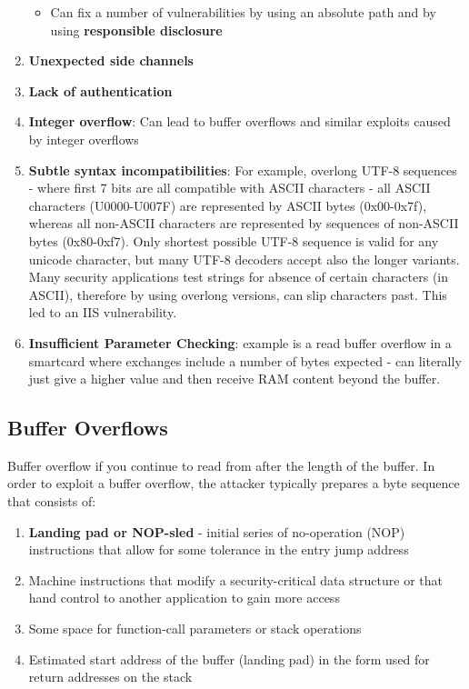 \documentclass{article}
\begin{document}
\begin{enumerate}
\begin{itemize}
		\item Can fix a number of vulnerabilities by using an absolute path and by using \textbf{responsible disclosure}
	\end{itemize}
	\item \textbf{ Unexpected side channels}
	\item \textbf{Lack of authentication}
	\item \textbf{Integer overflow}: Can lead to buffer overflows and similar exploits caused by integer overflows
	\item \textbf{Subtle syntax incompatibilities}: For example, overlong UTF-8 sequences - where first 7 bits are all compatible with ASCII characters - all ASCII characters (U0000-U007F) are represented by ASCII bytes (0x00-0x7f), whereas all non-ASCII characters are represented by sequences of non-ASCII bytes (0x80-0xf7). Only shortest possible UTF-8 sequence is valid for any unicode character, but many UTF-8 decoders accept also the longer variants. Many security applications test strings for absence of certain characters (in ASCII), therefore by using overlong versions, can slip characters past. This led to an IIS vulnerability.
	
	\item \textbf{Insufficient Parameter Checking}: example is a read buffer overflow in a smartcard where exchanges include a number of bytes expected - can literally just give a higher value and then receive RAM content beyond the buffer.
	

\end{enumerate}

\subsection{Buffer Overflows}
Buffer overflow if you continue to read from after the length of the buffer. In order to exploit a buffer overflow, the attacker typically prepares a byte sequence that consists of:
\begin{enumerate}
	\item \textbf{Landing pad or NOP-sled} - initial series of no-operation (NOP) instructions that allow for some tolerance in the entry jump address
	\item Machine instructions that modify a security-critical data structure or that hand control to another application to gain more access
	\item Some space for function-call parameters or stack operations
	\item Estimated start address of the buffer (landing pad) in the form used for return addresses on the stack
\end{enumerate}
\end{document}

